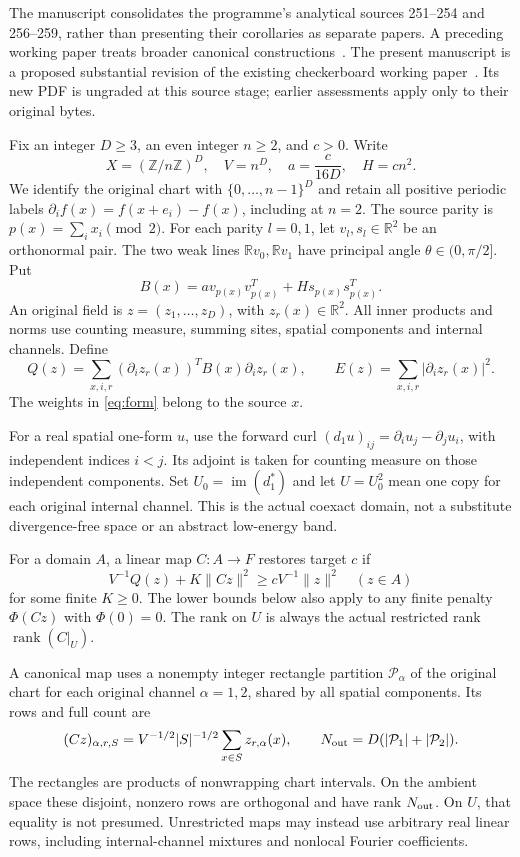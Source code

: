 \documentclass[11pt,a4paper]{article}
\newcommand{\R}{\mathbb R}
\newcommand{\Z}{\mathbb Z}
\newcommand{\im}{\operatorname{im}}
\newcommand{\rank}{\operatorname{rank}}
\newcommand{\norm}[1]{\lVert#1\rVert}
\begin{document}
The manuscript consolidates the programme's analytical sources 251--254 and 256--259,
rather than presenting their corollaries as separate papers. A preceding
working paper treats broader canonical constructions~\cite{eriksson250}.
The present manuscript is a proposed substantial revision of the existing
checkerboard working paper~\cite{eriksson255}. Its new PDF is ungraded at
this source stage; earlier assessments apply only to their original bytes.

Fix an integer $D\geq3$, an even integer $n\geq2$, and $c>0$. Write
\[
 X=(\Z/n\Z)^D,\quad V=n^D,\quad
 a=\frac{c}{16D},\quad H=cn^2.
\]
We identify the original chart with $\{0,\ldots,n-1\}^D$ and retain all
positive periodic labels $\partial_i f(x)=f(x+e_i)-f(x)$, including at $n=2$.
The source parity is $p(x)=\sum_i x_i\pmod2$. For each parity $l=0,1$,
let $v_l,s_l\in\R^2$ be an orthonormal pair. The two weak lines
$\R v_0,\R v_1$ have principal angle $\theta\in(0,\pi/2]$. Put
\[
 B(x)=a v_{p(x)}v_{p(x)}^T+H s_{p(x)}s_{p(x)}^T.
\]
An original field is $z=(z_1,\ldots,z_D)$, with $z_r(x)\in\R^2$.
All inner products and norms use counting measure, summing sites, spatial
components and internal channels. Define
\begin{equation}\label{eq:form}
 Q(z)=\sum_{x,i,r}(\partial_i z_r(x))^T B(x)\partial_i z_r(x),
 \qquad E(z)=\sum_{x,i,r}|\partial_i z_r(x)|^2.
\end{equation}
The weights in \eqref{eq:form} belong to the source $x$.

For a real spatial one-form $u$, use the forward curl
$(d_1u)_{ij}=\partial_i u_j-\partial_j u_i$, with independent indices $i<j$.
Its adjoint is taken for counting measure on those independent components.
Set $U_0=\im(d_1^*)$ and let $U=U_0^2$ mean one copy for each original
internal channel. This is the actual coexact domain, not a substitute
divergence-free space or an abstract low-energy band.

For a domain $A$, a linear map $C:A\to F$ restores target $c$ if
\begin{equation}\label{eq:restore}
 V^{-1}Q(z)+K\norm{Cz}^2\geq cV^{-1}\norm{z}^2\quad(z\in A)
\end{equation}
for some finite $K\geq0$. The lower bounds below also apply to any finite
penalty $\Phi(Cz)$ with $\Phi(0)=0$. The rank on $U$ is always the actual
restricted rank $\rank(C|_U)$.

A canonical map uses a nonempty integer rectangle partition $\mathcal P_\alpha$
of the original chart for each original channel $\alpha=1,2$, shared by all
spatial components. Its rows and full count are
\begin{equation}\label{eq:canonical}
 (Cz)_{\alpha,r,S}=V^{-1/2}|S|^{-1/2}\sum_{x\in S}z_{r,\alpha}(x),
 \qquad N_{\rm out}=D(|\mathcal P_1|+|\mathcal P_2|).
\end{equation}
The rectangles are products of nonwrapping chart intervals. On the ambient
space these disjoint, nonzero rows are orthogonal and have rank $N_{\rm out}$.
On $U$, that equality is not presumed. Unrestricted maps may instead use
arbitrary real linear rows, including internal-channel mixtures and nonlocal
Fourier coefficients.
\end{document}
